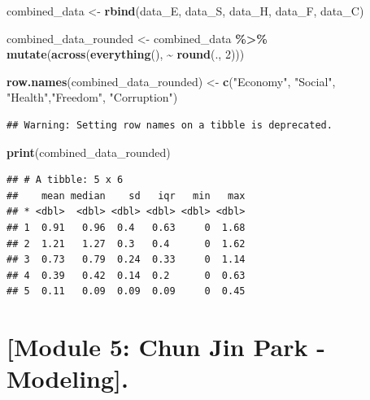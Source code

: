 \documentclass[
  11pt,
]{article}
\newenvironment{Shaded}{\begin{snugshade}}{\end{snugshade}}
\newcommand{\DecValTok}[1]{\textcolor[rgb]{0.00,0.00,0.81}{#1}}
\newcommand{\FunctionTok}[1]{\textcolor[rgb]{0.13,0.29,0.53}{\textbf{#1}}}
\newcommand{\NormalTok}[1]{#1}
\newcommand{\OtherTok}[1]{\textcolor[rgb]{0.56,0.35,0.01}{#1}}
\newcommand{\SpecialCharTok}[1]{\textcolor[rgb]{0.81,0.36,0.00}{\textbf{#1}}}
\newcommand{\StringTok}[1]{\textcolor[rgb]{0.31,0.60,0.02}{#1}}
\begin{document}
\begin{Shaded}
\begin{Highlighting}[]
\NormalTok{combined\_data }\OtherTok{\textless{}{-}} \FunctionTok{rbind}\NormalTok{(data\_E, data\_S, data\_H, data\_F, data\_C)}
\end{Highlighting}
\end{Shaded}

\begin{Shaded}
\begin{Highlighting}[]
\NormalTok{combined\_data\_rounded }\OtherTok{\textless{}{-}}\NormalTok{ combined\_data }\SpecialCharTok{\%\textgreater{}\%}
  \FunctionTok{mutate}\NormalTok{(}\FunctionTok{across}\NormalTok{(}\FunctionTok{everything}\NormalTok{(), }\SpecialCharTok{\textasciitilde{}} \FunctionTok{round}\NormalTok{(., }\DecValTok{2}\NormalTok{)))}
\end{Highlighting}
\end{Shaded}

\begin{Shaded}
\begin{Highlighting}[]
\FunctionTok{row.names}\NormalTok{(combined\_data\_rounded) }\OtherTok{\textless{}{-}} \FunctionTok{c}\NormalTok{(}\StringTok{"Economy"}\NormalTok{, }\StringTok{"Social"}\NormalTok{, }\StringTok{"Health"}\NormalTok{,}\StringTok{"Freedom"}\NormalTok{, }\StringTok{"Corruption"}\NormalTok{)}
\end{Highlighting}
\end{Shaded}

\begin{verbatim}
## Warning: Setting row names on a tibble is deprecated.
\end{verbatim}

\begin{Shaded}
\begin{Highlighting}[]
\FunctionTok{print}\NormalTok{(combined\_data\_rounded)}
\end{Highlighting}
\end{Shaded}

\begin{verbatim}
## # A tibble: 5 x 6
##    mean median    sd   iqr   min   max
## * <dbl>  <dbl> <dbl> <dbl> <dbl> <dbl>
## 1  0.91   0.96  0.4   0.63     0  1.68
## 2  1.21   1.27  0.3   0.4      0  1.62
## 3  0.73   0.79  0.24  0.33     0  1.14
## 4  0.39   0.42  0.14  0.2      0  0.63
## 5  0.11   0.09  0.09  0.09     0  0.45
\end{verbatim}

\section{{[}Module 5: Chun Jin Park -
Modeling{]}.}\label{module-5-chun-jin-park---modeling.}
\end{document}
